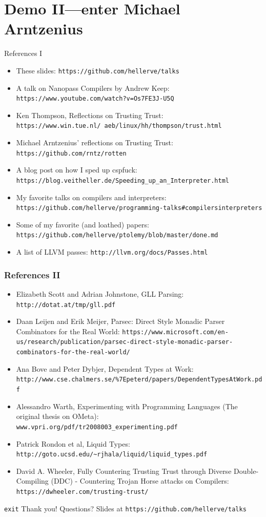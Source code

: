 \documentclass[aspectratio=169]{beamer}
\begin{document}
  \section{Demo II—enter Michael Arntzenius}
  \begin{frame}{References I}
    \begin{itemize}
      \item These slides: \texttt{https://github.com/hellerve/talks}
      \item A talk on Nanopass Compilers by Andrew Keep: \texttt{https://www.youtube.com/watch?v=Os7FE3J-U5Q}
      \item Ken Thompson, Reflections on Trusting Trust: \texttt{https://www.win.tue.nl/~aeb/linux/hh/thompson/trust.html}
      \item Michael Arntzenius’ reflections on Trusting Trust: \texttt{https://github.com/rntz/rotten}
      \item A blog post on how I sped up cspfuck: \texttt{https://blog.veitheller.de/Speeding\_up\_an\_Interpreter.html}
      \item My favorite talks on compilers and interpreters: \texttt{https://github.com/hellerve/programming-talks\#compilersinterpreters}
      \item Some of my favorite (and loathed) papers: \texttt{https://github.com/hellerve/ptolemy/blob/master/done.md}
      \item A list of LLVM passes: \texttt{http://llvm.org/docs/Passes.html}
    \end{itemize}
  \end{frame}
  \begin{frame}[fragile]
    \frametitle{References II}
    \begin{itemize}
      \item Elizabeth Scott and Adrian Johnstone, GLL Parsing: \texttt{http://dotat.at/tmp/gll.pdf}
      \item Daan Leijen and Erik Meijer, Parsec: Direct Style Monadic Parser Combinators for the Real World: \texttt{https://www.microsoft.com/en-us/research/publication/parsec-direct-style-monadic-parser-combinators-for-the-real-world/}
      \item Ana Bove and Peter Dybjer, Dependent Types at Work: \texttt{http://www.cse.chalmers.se/\%7Epeterd/papers/DependentTypesAtWork.pdf}
      \item Alessandro Warth, Experimenting with Programming Languages (The original thesis on OMeta): \texttt{www.vpri.org/pdf/tr2008003\_experimenting.pdf}
      \item Patrick Rondon et al, Liquid Types: \texttt{http://goto.ucsd.edu/\textasciitilde rjhala/liquid/liquid\_types.pdf}
      \item David A. Wheeler, Fully Countering Trusting Trust through Diverse Double-Compiling (DDC) - Countering Trojan Horse attacks on Compilers: \texttt{https://dwheeler.com/trusting-trust/}
    \end{itemize}
  \end{frame}
  \begin{frame}{\texttt{exit}}
    \Huge Thank you!
    \linebreak
    \linebreak
    \linebreak
    \small Questions?
    \linebreak
    \linebreak
    \tiny Slides at \texttt{https://github.com/hellerve/talks}
  \end{frame}
\end{document}
